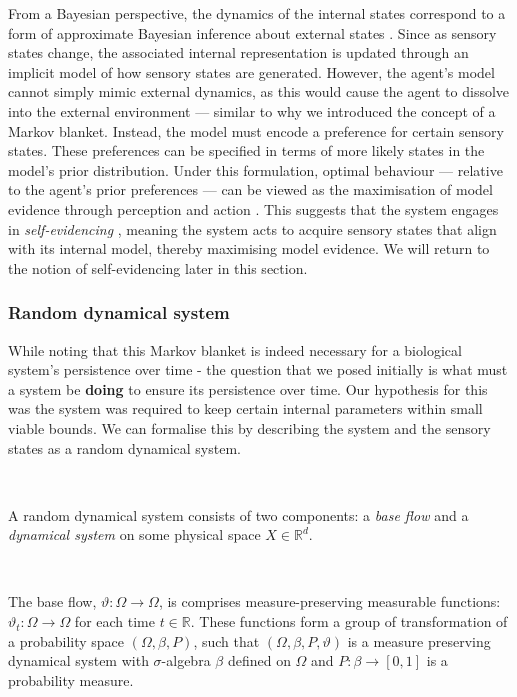 \documentclass{article}
\newcommand{\R}{\mathbb{R}}
\begin{document}
From a Bayesian perspective, the dynamics of the internal states correspond to a form of approximate Bayesian inference about external states \citep{parr2022ActiveInference}. Since as sensory states change, the associated internal representation is updated through an implicit model of how sensory states are generated. However, the agent’s model cannot simply mimic external dynamics, as this would cause the agent to dissolve into the external environment — similar to why we introduced the concept of a Markov blanket. Instead, the model must encode a preference for certain sensory states. These preferences can be specified in terms of more likely states in the model’s prior distribution. Under this formulation, optimal behaviour — relative to the agent's prior preferences — can be viewed as the maximisation of model evidence through perception and action \citep{parr2022ActiveInference}. This suggests that the system engages in \textit{self-evidencing} \citep{hohwy2016evidencing}, meaning the system acts to acquire sensory states that align with its internal model, thereby maximising model evidence. We will return to the notion of self-evidencing later in this section. 


\subsubsection{Random dynamical system}

While noting that this Markov blanket is indeed necessary for a biological system's persistence over time - the question that we posed initially is what must a system be \textbf{doing} to ensure its persistence over time. Our hypothesis for this was the system was required to keep certain internal parameters within small viable bounds. We can formalise this by describing the system and the sensory states as a random dynamical system. 

\

A random dynamical system consists of two components: a \textit{base flow} and a \textit{dynamical system} on some physical space $X \in \R^d$.

\

The base flow, $\vartheta: \Omega \to \Omega$, is comprises measure-preserving measurable functions: $\vartheta_t: \Omega \to \Omega$ for each time $t \in \R$. These functions form a group of transformation of a probability space $(\Omega, \beta, P)$, such that $(\Omega, \beta, P, \vartheta)$ is a measure preserving dynamical system with $\sigma$-algebra $\beta$ defined on $\Omega$ and $P: \beta \to [0, 1]$ is a probability measure.
\end{document}
